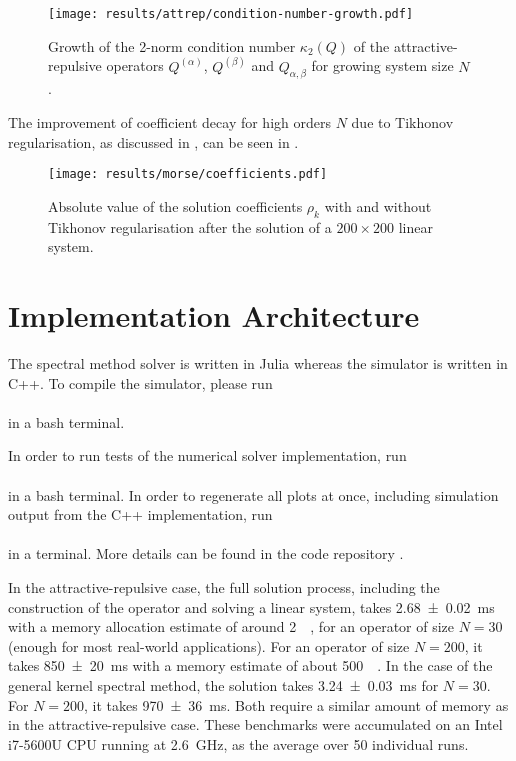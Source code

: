 \begin{figure}[H]
  \centering
  \texttt{[image: results/attrep/condition-number-growth.pdf]}
  \caption[Growth of the condition number]{Growth of the 2-norm condition number $\kappa_2(Q)$ of the attractive-repulsive operators $Q^{(\alpha)}$, $Q^{(\beta)}$ and $Q_{\alpha,\beta}$ for growing system size $N$.}
  \label{fig:condition-number-growth}
\end{figure}

The improvement of coefficient decay for high orders $N$ due to Tikhonov regularisation, as discussed in , can be seen in .

\begin{figure}[H]
  \centering
  \texttt{[image: results/morse/coefficients.pdf]}
  \caption[Absolute value of the coefficients with and without regularisation]{Absolute value of the solution coefficients $\rho_k$ with and without Tikhonov regularisation after the solution of a $200 \times 200$ linear system.}
  \label{fig:coefficients}
\end{figure}

\section{Implementation Architecture}
The spectral method solver is written in Julia \parencite{2017-julia} whereas the simulator is written in C++.
To compile the simulator, please run \\
 \\
in a bash terminal.

In order to run tests of the numerical solver implementation, run \\
 \\
in a bash terminal. In order to regenerate all plots at once, including simulation output from the C++ implementation, run \\
 \\
in a terminal.
More details can be found in the code repository \parencite{2023-my-dissertation}.

In the attractive-repulsive case, the full solution process, including the construction of the operator and solving a linear system, takes \SI{2.68 \pm 0.02}{\milli\second} with a memory allocation estimate of around \SI{2}{\mega\byte}, for an operator of size $N=30$ (enough for most real-world applications).
For an operator of size $N = 200$, it takes \SI{850 \pm 20}{\milli\second} with a memory estimate of about \SI{500}{\mega\beta}.
In the case of the general kernel spectral method, the solution takes \SI{3.24 \pm 0.03}{\milli\second} for $N=30$.
For $N=200$, it takes \SI{970 \pm 36}{\milli\second}.
Both require a similar amount of memory as in the attractive-repulsive case.
These benchmarks were accumulated on an Intel \textregistered \, i7-5600U CPU running at \SI{2.6}{\giga\hertz}, as the average over 50 individual runs.
